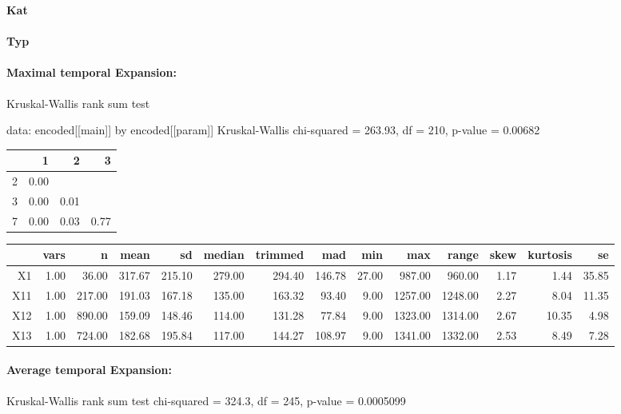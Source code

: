 \documentclass[a4paper,headsepline,footsepline,fontsize=11pt,BCOR=12mm,DIV=12]{report}
\begin{document}
\large
\centerline{\textbf{Kat}}
\normalsize

\paragraph{}


\large
\centerline{\textbf{Typ}}
\normalsize

\paragraph{Maximal temporal Expansion:}

Kruskal-Wallis rank sum test

data:  encoded[[main]] by encoded[[param]]
Kruskal-Wallis chi-squared = 263.93, df = 210, p-value = 0.00682

% 
\begin{tabular}{rrrr}
  \hline
 & 1 & 2 & 3 \\ 
  \hline
2 & 0.00 &  &  \\ 
  3 & 0.00 & 0.01 &  \\ 
  7 & 0.00 & 0.03 & 0.77 \\ 
   \hline
\end{tabular}

\begin{tabular}{rrrrrrrrrrrrrr}
  \hline
 & vars & n & mean & sd & median & trimmed & mad & min & max & range & skew & kurtosis & se \\ 
  \hline
X1 & 1.00 & 36.00 & 317.67 & 215.10 & 279.00 & 294.40 & 146.78 & 27.00 & 987.00 & 960.00 & 1.17 & 1.44 & 35.85 \\ 
  X11 & 1.00 & 217.00 & 191.03 & 167.18 & 135.00 & 163.32 & 93.40 & 9.00 & 1257.00 & 1248.00 & 2.27 & 8.04 & 11.35 \\ 
  X12 & 1.00 & 890.00 & 159.09 & 148.46 & 114.00 & 131.28 & 77.84 & 9.00 & 1323.00 & 1314.00 & 2.67 & 10.35 & 4.98 \\ 
  X13 & 1.00 & 724.00 & 182.68 & 195.84 & 117.00 & 144.27 & 108.97 & 9.00 & 1341.00 & 1332.00 & 2.53 & 8.49 & 7.28 \\ 
   \hline
\end{tabular}

\paragraph{Average temporal Expansion:}
Kruskal-Wallis rank sum test chi-squared = 324.3, df = 245, p-value = 0.0005099
\end{document}
